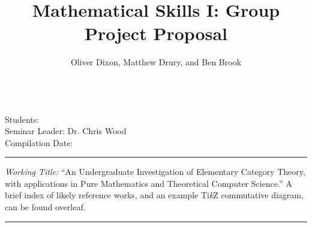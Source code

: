 \documentclass{article}
\title{Mathematical Skills I: Group Project Proposal}
\author{Oliver Dixon, Matthew Drury, and Ben Brook}
\newcommand{\semleader}{Dr. Chris Wood}
\begin{document}
%
\thispagestyle{titlepage}
\pagestyle{genpage}
\makeatletter
\noindent\large\textbf{\@title}\\[0.8\baselineskip]
\normalsize Students: \@author\\
Seminar Leader: \semleader\\
Compilation Date: \@date%
\makeatother
%
\vspace{1.5\baselineskip}\hrule\vspace{\baselineskip}
\textit{Working Title:} ``An Undergraduate Investigation of Elementary
Category Theory, with applications in Pure Mathematics and Theoretical Computer
Science.'' A brief index of likely reference works, and an example Ti\textit{k}Z
commutative diagram, can be found overleaf.
\vspace{\baselineskip}\hrule\vspace{\baselineskip}
%
\end{document}
